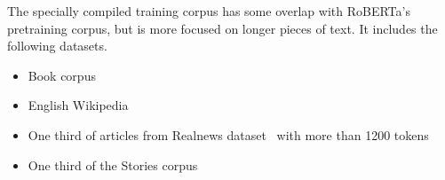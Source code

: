 The specially compiled training corpus has some overlap with RoBERTa's
pretraining corpus, but is more focused on longer pieces of text. It includes
the following datasets.

\begin{itemize}
  \item Book corpus~\citep{zhu2015aligning}

  \item English Wikipedia

  \item One third of articles from Realnews dataset~\citep{zellers2019defending}
      with more than 1200 tokens

  \item One third of the Stories corpus~\citep{trinh2018simple}

\end{itemize}

